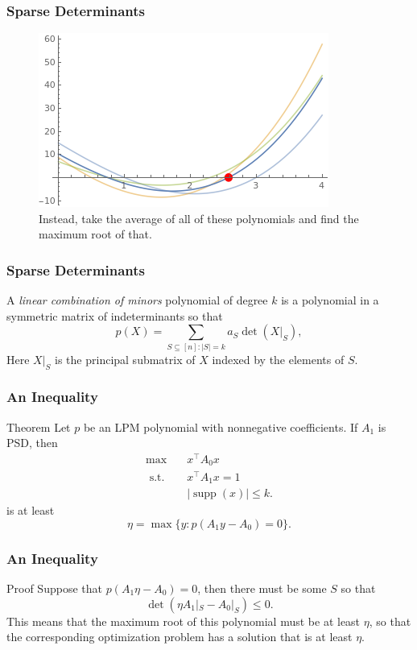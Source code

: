 \documentclass{beamer}
\DeclareMathOperator*{\supp}{supp}
\newcommand{\st}{{\text{ s.t. }}}
\begin{document}
\begin{frame}
    \frametitle{Sparse Determinants}
    \begin{figure}[h]
        \centering
        \includegraphics[width=0.6\linewidth]{univariates_average_root.png}
        \caption{Instead, take the average of all of these polynomials and find the maximum root of that.}%
        \label{fig:variety}
    \end{figure}
\end{frame}
\begin{frame}
    \frametitle{Sparse Determinants}
    A \emph{linear combination of minors} polynomial of degree $k$ is a polynomial in a symmetric matrix of indeterminants so that
    \[
        p(X) = \sum_{S \subseteq [n] : |S| = k}a_S\det(X|_S),
    \]
    Here $X|_S$ is the principal submatrix of $X$ indexed by the elements of $S$.
\end{frame}
\begin{frame}
    \frametitle{An Inequality}
    \begin{block}{Theorem}
        Let $p$ be an LPM polynomial with nonnegative coefficients.  If $A_1$ is PSD, then
        \begin{equation*}
            \begin{aligned}
                \max\quad & x^{\intercal}A_0x\\
                \st & x^{\intercal}A_1x = 1\\
                    &|\supp(x)| \le k.
            \end{aligned}
        \end{equation*}
        is at least 
        \[
            \eta = \max \{y : p(A_1y-A_0) = 0 \}.
        \]
    \end{block}
\end{frame}
\begin{frame}
    \frametitle{An Inequality}
    \begin{block}{Proof}
        Suppose that $p(A_1 \eta-A_0) = 0$, then there must be some $S$ so that 
        \[
            \det(\eta A_1|_S - A_0|_S) \le 0.
        \]
        This means that the maximum root of this polynomial must be at least $\eta$, so that the corresponding optimization problem has a solution that is at least $\eta$.
    \end{block}
\end{frame}
\end{document}
